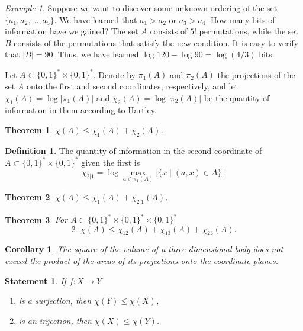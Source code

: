 \documentclass[12pt,sans]{article}
\newcommand{\bits}{\{0,1\}}
\newcommand{\bitstr}{\bits^*}
\newcommand{\seqn}[2]{{#1}_1,{#1}_2,\dotsc,{#1}_{#2}}
\theoremstyle{definition}
\newtheorem{definition}{Definition}[section]
\theoremstyle{plain}
\newtheorem{theorem}{Theorem}[section]
\newtheorem{statement}{Statement}[section]
\newtheorem{corollary}{Corollary}[section]
\theoremstyle{remark}
\newtheorem{example}{Example}[section]
\begin{document}
\begin{example}
    Suppose we want to discover some unknown ordering of the set $\{\seqn{a}{5}\}$. We have learned that \(a_1>a_2\) or \(a_3>a_4\). How many bits of information have we gained? The set \(A\) consists of \(5!\) permutations, while the set \(B\) consists of the permutations that satisfy the new condition. It is easy to verify that \(|B| = 90\). Thus, we have learned \(\log 120 - \log 90 = \log(4/3)\) bits.
\end{example}

Let \(A\subset\bitstr\times\bitstr\). Denote by \(\pi_1(A)\) and \(\pi_2(A)\) the projections of the set \(A\) onto the first and second coordinates, respectively, and let \(\chi_1(A) = \log|\pi_1(A)|\) and \(\chi_2(A) = \log|\pi_2(A)|\) be the quantity of information in them according to Hartley.

\begin{theorem}
    \(\chi(A) \le \chi_1(A) + \chi_2(A)\).
\end{theorem}

\begin{definition}
    The quantity of information in the second coordinate of \(A\subset\bitstr\times\bitstr\) given the first is
    \[\chi_{2|1} = \log\max_{a\in\pi_1(A)}\bigl|\{x \mid (a, x)\in A\}\bigr|.\]
\end{definition}

\begin{theorem}
    \(\chi(A) \le \chi_1(A) + \chi_{2|1}(A)\).
\end{theorem}

\begin{theorem}\label{thm:volume}
    For \(A\subset\bitstr\times\bitstr\times\bitstr\)
    \[2\cdot\chi(A) \le \chi_{12}(A) + \chi_{13}(A) + \chi_{23}(A).\]
\end{theorem}
\begin{corollary}
    The square of the volume of a three-dimensional body does not exceed the product of the areas of its projections onto the coordinate planes.
\end{corollary}

\begin{statement}
    If \(f: X\to Y\)
    \begin{enumerate}
        \item is a surjection, then \(\chi(Y)\le \chi(X)\),
        \item is an injection, then \(\chi(X)\le \chi(Y)\).
    \end{enumerate}
\end{statement}
\end{document}
